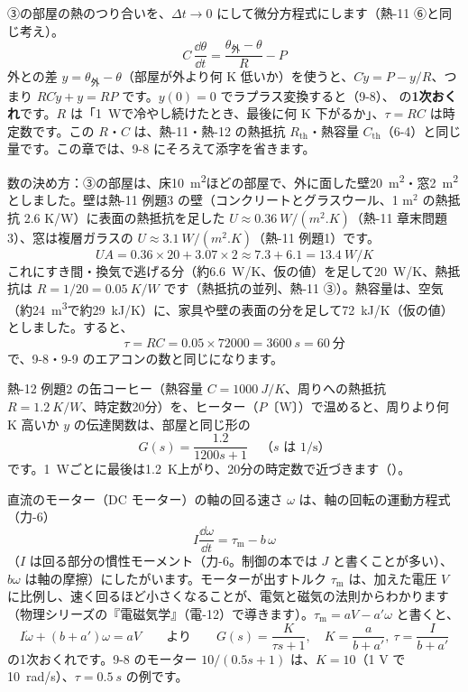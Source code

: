 ③の部屋の熱のつり合いを、$\Delta t\to0$ にして微分方程式にします（熱-11 ⑥と同じ考え）。
\[C\,\frac{\dd\theta}{\dd t}=\frac{\theta_{\text{外}}-\theta}{R}-P\]
外との差 $y=\theta_{\text{外}}-\theta$（部屋が外より何 K 低いか）を使うと、$C\dot y=P-y/R$、つまり $RC\dot y+y=RP$ です。$y(0)=0$ でラプラス変換すると（9-8）、
の\textbf{1次おくれ}です。$R$ は「\qty{1}{W}で冷やし続けたとき、最後に何 K 下がるか」、$\tau=RC$ は時定数です。この $R$・$C$ は、熱-11・熱-12 の熱抵抗 $R_{\mathrm{th}}$・熱容量 $C_{\mathrm{th}}$（6-4）と同じ量です。この章では、9-8 にそろえて添字を省きます。

数の決め方：③の部屋は、床\qty{10}{m^2}ほどの部屋で、外に面した壁\qty{20}{m^2}・窓\qty{2}{m^2}としました。壁は熱-11 例題3 の壁（コンクリートとグラスウール、1 m$^2$ の熱抵抗 2.6 K/W）に表面の熱抵抗を足した $U\approx\qty{0.36}{W/(m^2.K)}$（熱-11 章末問題3）、窓は複層ガラスの $U\approx\qty{3.1}{W/(m^2.K)}$（熱-11 例題1）です。
\[UA=0.36\times20+3.07\times2\approx7.3+6.1=\qty{13.4}{W/K}\]
これにすき間・換気で逃げる分（約\qty{6.6}{W/K}、仮の値）を足して\qty{20}{W/K}、熱抵抗は $R=1/20=\qty{0.05}{K/W}$ です（熱抵抗の並列、熱-11 ③）。熱容量は、空気（約\qty{24}{m^3}で約\qty{29}{kJ/K}）に、家具や壁の表面の分を足して\qty{72}{kJ/K}（仮の値）としました。すると、
\[\tau=RC=0.05\times\num{72000}=\qty{3600}{s}=60\ \text{分}\]
で、9-8・9-9 のエアコンの数と同じになります。

熱-12 例題2 の缶コーヒー（熱容量 $C=\qty{1000}{J/K}$、周りへの熱抵抗 $R=\qty{1.2}{K/W}$、時定数20分）を、ヒーター（$P$〔W〕）で温めると、周りより何 K 高いか $y$ の伝達関数は、部屋と同じ形の
\[G(s)=\frac{1.2}{1200s+1}\quad\text{（$s$ は 1/s）}\]
です。\qty{1}{W}ごとに最後は\qty{1.2}{K}上がり、20分の時定数で近づきます（）。

直流のモーター（DC モーター）の軸の回る速さ $\omega$ は、軸の回転の運動方程式（力-6）
\[I\frac{\dd\omega}{\dd t}=\tau_{\mathrm m}-b\,\omega\]
（$I$ は回る部分の慣性モーメント（力-6。制御の本では $J$ と書くことが多い）、$b\omega$ は軸の摩擦）にしたがいます。モーターが出すトルク $\tau_{\mathrm m}$ は、加えた電圧 $V$ に比例し、速く回るほど小さくなることが、電気と磁気の法則からわかります（物理シリーズの『電磁気学』（電-12）で導きます）。$\tau_{\mathrm m}=aV-a'\omega$ と書くと、
\[I\dot\omega+(b+a')\omega=aV\qquad\text{より}\qquad G(s)=\frac{K}{\tau s+1},\quad K=\frac{a}{b+a'},\ \tau=\frac{I}{b+a'}\]
の1次おくれです。9-8 のモーター $10/(0.5s+1)$ は、$K=10$（1 V で\qty{10}{rad/s}）、$\tau=\qty{0.5}{s}$ の例です。

